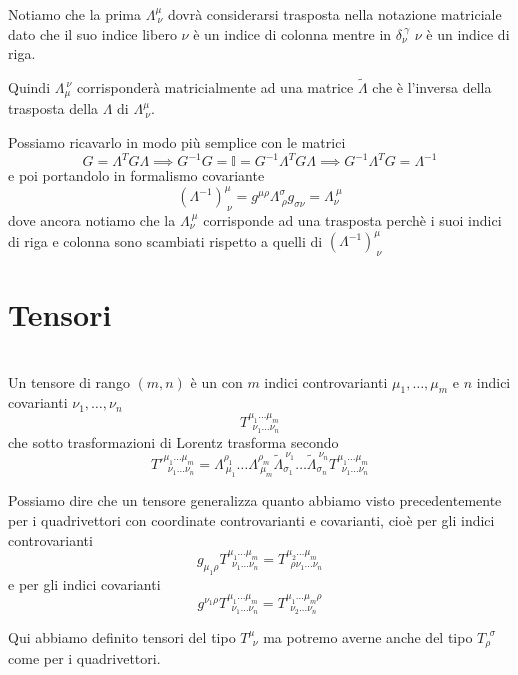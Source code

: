 \documentclass[12pt,a4paper,titlepage, twoside, openright]{book}
\newenvironment{definizione}[1][\empty]{\begin{Definizione}{
\ifx\empty#1\relax\else\mdseries\itshape#1\\\fi
}{}}{\end{Definizione}}
\numberwithin{equation}{chapter}
\begin{document}
Notiamo che la prima $\Lambda^{\mu}_{\>\nu}$ dovrà considerarsi trasposta nella notazione matriciale dato che il suo indice libero $\nu$ è un indice di colonna mentre in $\delta_{\nu}^{\>\gamma}$ $\nu$ è un indice di riga. 

Quindi $\Lambda^{\> \nu}_{\mu}$ corrisponderà matricialmente ad una matrice $\tilde{\Lambda}$ che è l'inversa della trasposta della $\Lambda$ di $\Lambda^\mu_{\> \nu}$.

Possiamo ricavarlo in modo più semplice con le matrici
\[
G=\Lambda^T G \Lambda \implies G^{-1}G=\mathbb{I}=G^{-1}\Lambda^T G \Lambda\implies G^{-1}\Lambda^T G= \Lambda^{-1}
\]
e poi portandolo in formalismo covariante
\[
(\Lambda^{-1})^\mu_{\> \nu} = g^{\mu\rho}\Lambda^\sigma_{\> \rho} g_{\sigma\nu}=\Lambda_{\nu}^{\> \mu}
\]
dove ancora notiamo che la $\Lambda_{\nu}^{\> \mu}$ corrisponde ad una trasposta perchè i suoi indici di riga e colonna sono scambiati rispetto a quelli di $(\Lambda^{-1})^\mu_{\> \nu}$

\section{Tensori}\label{sezTensori}

\begin{definizione}
Un tensore di rango $(m,n)$ è un con $m$ indici controvarianti $\mu_1,\dots,\mu_m$ e $n$ indici covarianti $\nu_1,\dots,\nu_n$ 
\[
T^{\mu_1\dots\mu_m}_{\>\> \nu_1\dots\nu_n}
\]
che sotto trasformazioni di Lorentz trasforma secondo
\[
T'^{\mu_1\dots\mu_m}_{\>\> \nu_1\dots\nu_n}=
\Lambda_{\>\mu_1}^{\rho_1}\dots\Lambda_{\>\mu_m}^{ \rho_m}\tilde{\Lambda}_{ \sigma_1}^{\> \nu_1}\dots\tilde{\Lambda}_{ \sigma_n}^{\> \nu_n}T^{\mu_1\dots\mu_m}_{\>\> \nu_1\dots\nu_n}
\]
\end{definizione}
Possiamo dire che un tensore generalizza quanto abbiamo visto precedentemente per i quadrivettori con coordinate controvarianti e covarianti\footnotemark{}, cioè per gli indici controvarianti
\[
g_{\mu_1\rho}T^{\mu_1\dots\mu_m}_{\>\> \nu_1\dots\nu_n}=T^{\mu_2\dots\mu_m}_{\>\>\rho\nu_1\dots\nu_n}
\]
e per gli indici covarianti
\[
g^{\nu_1\rho}T^{\mu_1\dots\mu_m}_{\>\>\nu_1\dots\nu_n}=T^{\mu_1\dots\mu_m\rho}_{\>\>\nu_2\dots\nu_n}
\]


Qui abbiamo definito tensori del tipo $T_{\>\>\nu}^\mu$ ma potremo averne anche del tipo $T^{\>\>\sigma}_{\rho}$ come per i quadrivettori.
\end{document}
